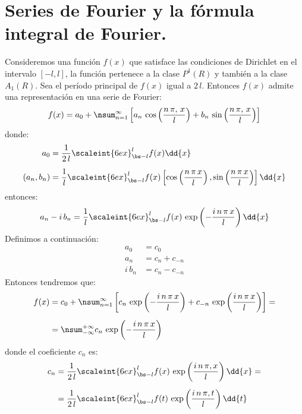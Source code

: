 
\section{Series de Fourier y la fórmula integral de Fourier.}

Consideremos una función $f(x)$ que satisface las condiciones de Dirichlet en el intervalo $[-l, l]$, la función pertenece a la clase $P^{1} (R)$ y también a la clase $A_{1} (R)$. Sea el período principal de $f(x)$ igual a $2 \, l$. Entonces $f(x)$ admite una representación en una serie de Fourier:
\begin{align*}
f(x) = a_{0} + \nsum_{n=1}^{\infty} \left[ a_{n} \, \cos \left( \dfrac{n \, \pi, \, x}{l}  \right) + b_{n} \, \sin \left( \dfrac{n \, \pi, \, x}{l}  \right) \right]
\end{align*}
donde:
\begin{align*}
a_{0} &= \dfrac{1}{2 \, l} \scaleint{6ex}_{\bs -l}^{l} f(x) \dd{x} \\[0.5em]
(a_{n}, b_{n}) &= \dfrac{1}{l} \scaleint{6ex}_{\bs -l}^{l} f(x) \left[ \cos \left( \dfrac{n \, \pi \, x}{l} \right), \sin \left( \dfrac{n \, \pi \, x}{l} \right) \right] \dd{x}
\end{align*}
entonces:
\begin{align*}
a_{n} - i \, b_{n} = \dfrac{1}{l} \scaleint{6ex}_{\bs -l}^{l} f(x) \, \exp \left( - \dfrac{i \, n \, \pi \, x}{l} \right) \dd{x}
\end{align*}
Definimos a continuación:
\begin{align*}
a_{0} &= c_{0} \\
a_{n} &= c_{n} + c_{-n} \\
i \, b_{n} &= c_{n} - c_{-n}
\end{align*}
Entonces tendremos que:
\begin{align}
\begin{aligned}[b]
f(x) &= c_{0} + \nsum_{n=1}^{\infty} \left[ c_{n} \, \exp \left( -\dfrac{i \, n \, \pi \, x}{l} \right) + c_{-n} \, \exp \left( \dfrac{i \, n \, \pi \, x}{l} \right) \right] = \\[0.5em]
&= \nsum_{-\infty}^{+\infty} c_{n} \, \exp \left( - \dfrac{i \, n \, \pi \, x}{l} \right)
\end{aligned}
\label{eq:ecuacion_01_02}
\end{align}
donde el coeficiente $c_{n}$ es:
\begin{align}
\begin{aligned}[b]
c_{n} &= \dfrac{1}{2 \, l} \scaleint{6ex}_{\bs -l}^{l} f(x) \, \exp \left( \dfrac{i \, n \, \pi, x}{l} \right) \dd{x} = \\[0.5em]
&= \dfrac{1}{2 \, l} \scaleint{6ex}_{\bs -l}^{l} f(t) \, \exp \left( \dfrac{i \, n \, \pi, t}{l} \right) \dd{t}
\end{aligned}
\label{eq:ecuacion_01_03}
\end{align}
